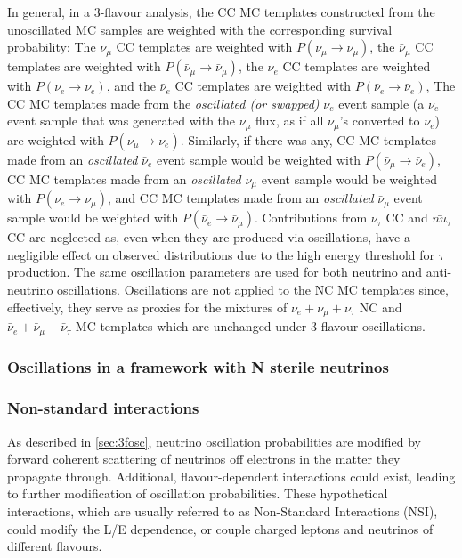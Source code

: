 In general, in a 3-flavour analysis,
the CC MC templates constructed from the unoscillated MC samples are 
weighted with the corresponding survival probability: 
The $\nu_{\mu}$ CC templates are weighted with $P(\nu_{\mu}\rightarrow \nu_{\mu})$,
the $\bar{\nu}_{\mu}$ CC templates are weighted with $P(\bar{\nu}_{\mu}\rightarrow \bar{\nu}_{\mu})$,
the $\nu_{e}$ CC templates are weighted with $P(\nu_{e}\rightarrow \nu_{e})$, and
the $\bar{\nu}_{e}$ CC templates are weighted with $P(\bar{\nu}_{e}\rightarrow \bar{\nu}_{e})$,
The CC MC templates made from the {\em oscillated (or swapped)} $\nu_{e}$ event sample
(a $\nu_{e}$ event sample that was generated with the $\nu_{\mu}$ flux, 
as if all $\nu_{\mu}$'s converted to $\nu_{e}$) are weighted with $P(\nu_{\mu}\rightarrow \nu_{e})$.
Similarly, if there was any, 
CC MC templates made from an {\em oscillated} $\bar{\nu}_{e}$ event sample 
would be weighted with $P(\bar{\nu}_{\mu}\rightarrow \bar{\nu}_{e})$,
CC MC templates made from an {\em oscillated} ${\nu}_{\mu}$ event sample 
would be weighted with $P({\nu}_{e}\rightarrow {\nu}_{\mu})$, and
CC MC templates made from an {\em oscillated} $\bar{\nu}_{\mu}$ event sample 
would be weighted with $P(\bar{\nu}_{e}\rightarrow \bar{\nu}_{\mu})$.
Contributions from $\nu_{\tau}$ CC and $\bar{nu}_{\tau}$ CC are neglected as,
even when they are produced via oscillations, have a negligible effect on
observed distributions due to the high energy threshold for $\tau$ production.
The same oscillation parameters are used for both neutrino and anti-neutrino oscillations. 
Oscillations are not applied to the NC MC templates since, effectively, 
they serve as proxies for the mixtures of $\nu_{e} + \nu_{\mu} + \nu_{\tau}$ NC and
$\bar{\nu}_{e} + \bar{\nu}_{\mu} + \bar{\nu}_{\tau}$
MC templates which are unchanged under 3-flavour oscillations.


%
%
%

\subsubsection{Oscillations in a framework with N sterile neutrinos}
\label{sec:3pNosc}

%
%
%

\subsubsection{Non-standard interactions}
\label{sec:nsi}

As described in \ref{sec:3fosc}, neutrino oscillation probabilities are modified by forward coherent scattering of neutrinos off electrons in the matter they propagate through. Additional, flavour-dependent interactions could exist, leading to further modification of oscillation probabilities. These hypothetical interactions, which are usually referred to as Non-Standard Interactions (NSI), could modify the L/E dependence, or couple charged leptons and neutrinos of different flavours.

